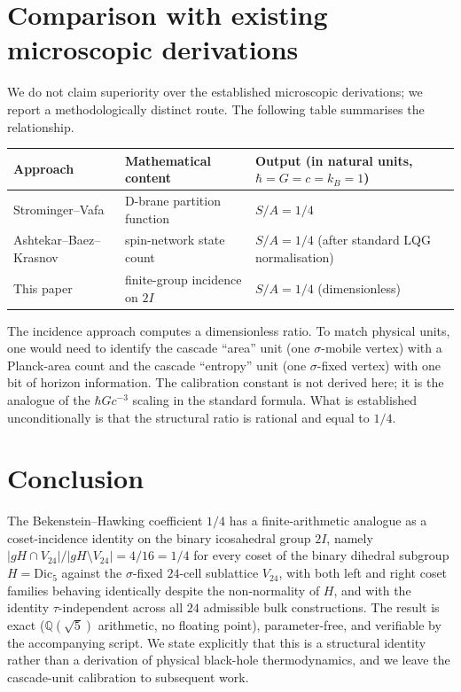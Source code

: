 \documentclass[11pt]{article}
\newcommand{\twoI}{2I}
\newcommand{\Dicfive}{\mathrm{Dic}_5}
\newcommand{\Vtwentyfour}{V_{24}}
\newcommand{\sigmaG}{\sigma}
\begin{document}
\section{Comparison with existing microscopic derivations}\label{sec:comparison}

We do not claim superiority over the established microscopic
derivations; we report a methodologically distinct route. The
following table summarises the relationship.

\begin{table}[h]
\centering
\begin{tabular}{l l l}
\toprule
Approach & Mathematical content & Output (in natural units, $\hbar = G = c = k_B = 1$) \\
\midrule
Strominger--Vafa \citep{StromingerVafa1996} & D-brane partition function & $S/A = 1/4$ \\
Ashtekar--Baez--Krasnov \citep{AshtekarBaezKrasnov2000} & spin-network state count & $S/A = 1/4$ (after standard LQG normalisation) \\
This paper & finite-group incidence on $\twoI$ & $S/A = 1/4$ (dimensionless) \\
\bottomrule
\end{tabular}
\end{table}

The incidence approach computes a dimensionless ratio. To match
physical units, one would need to identify the cascade ``area'' unit
(one $\sigmaG$-mobile vertex) with a Planck-area count and the
cascade ``entropy'' unit (one $\sigmaG$-fixed vertex) with one bit of
horizon information. The calibration constant is not derived here; it
is the analogue of the $\hbar G c^{-3}$ scaling in the standard
formula. What is established unconditionally is that the structural
ratio is rational and equal to $1/4$.

\section{Conclusion}\label{sec:concl}

The Bekenstein--Hawking coefficient $1/4$ has a finite-arithmetic
analogue as a coset-incidence identity on the binary icosahedral
group $\twoI$, namely $|gH \cap \Vtwentyfour|/|gH \setminus \Vtwentyfour|
= 4/16 = 1/4$ for every coset of the binary dihedral subgroup
$H = \Dicfive$ against the $\sigmaG$-fixed $24$-cell sublattice
$\Vtwentyfour$, with both left and right coset families behaving
identically despite the non-normality of $H$, and with the identity
$\tau$-independent across all $24$ admissible bulk constructions.
The result is exact ($\mathbb{Q}(\sqrt{5})$ arithmetic, no floating
point), parameter-free, and verifiable by the accompanying script. We
state explicitly that this is a structural identity rather than a
derivation of physical black-hole thermodynamics, and we leave the
cascade-unit calibration to subsequent work.
\end{document}
